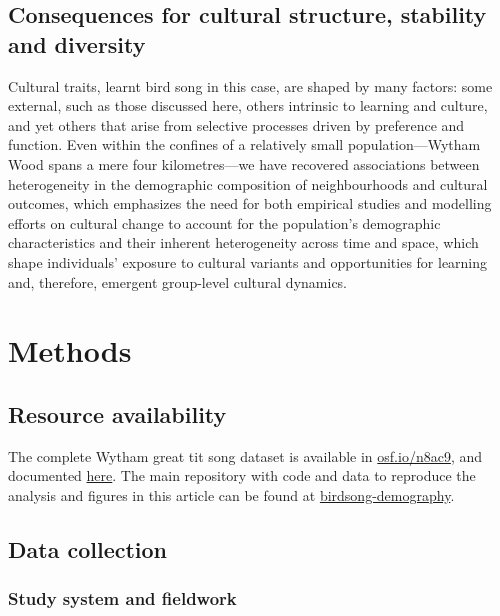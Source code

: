 \subsection{Consequences for cultural structure, stability and diversity}

Cultural traits, learnt bird song in this case, are shaped by many factors: some external, such as those discussed here, others intrinsic to learning and culture, and yet others that arise from selective processes driven by preference and function. Even within the confines of a relatively small population---Wytham Wood spans a mere four kilometres---we have recovered associations between heterogeneity in the demographic composition of neighbourhoods and cultural outcomes, which emphasizes the need for both empirical studies and modelling efforts on cultural change to account for the population's demographic characteristics and their inherent heterogeneity across time and space, which shape individuals' exposure to cultural variants and opportunities for learning and, therefore, emergent group-level cultural dynamics.

\section{Methods}

\subsection{Resource availability}

The complete Wytham great tit song dataset is available in \href{https://osf.io/n8ac9}{osf.io/n8ac9}, and documented \href{https://nilomr.github.io/great-tit-hits/}{here}. The main repository with code and data to reproduce the analysis and figures in this article can be found at \href{http://github.com/nilomr/birdsong-demography}{birdsong-demography}.

\subsection{Data collection}

\subsubsection{Study system and fieldwork}

